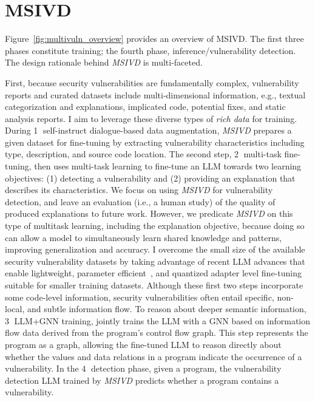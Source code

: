 \documentclass[12pt,openany,oneside,table]{cmuthesis}
\begin{document}
\section{MSIVD}

Figure~\ref{fig:multivuln_overview} provides an overview of MSIVD. The first three phases constitute training; the fourth phase, inference/vulnerability detection.
The design rationale behind \textit{MSIVD} is multi-faceted.  

First, because security vulnerabilities are fundamentally complex, 
vulnerability reports and curated datasets include multi-dimensional information, e.g., textual categorization and explanations, implicated code, potential fixes, and static analysis reports.  
I aim to leverage these diverse types of \emph{rich data} for training. 
During \textcircled{1} self-instruct dialogue-based data augmentation, \textit{MSIVD} prepares a given dataset for fine-tuning by extracting vulnerability characteristics including type, description, and source code location. 
The second step, \textcircled{2} multi-task fine-tuning, then uses multi-task learning to fine-tune an LLM towards two learning objectives:
(1) detecting a vulnerability and (2) providing an explanation that describes its characteristics. We focus on using \textit{MSIVD} for vulnerability detection, and leave an evaluation (i.e., a human study) of the quality of produced explanations to future work. However, we predicate \textit{MSIVD} on this type of multitask learning, including the explanation objective, because doing so can allow a model to simultaneously learn shared knowledge and patterns, improving generalization and accuracy. 
I overcome the small size of the available security vulnerability datasets
by taking advantage of recent LLM advances that enable lightweight, parameter efficient~\cite{peft}, and quantized adapter level fine-tuning~\cite{Llmao} suitable for smaller training datasets. 
Although these first two steps incorporate some code-level information, security vulnerabilities often entail specific, non-local, and subtle information flow.  
To reason about deeper semantic information, 
\textcircled{3} LLM+GNN training, jointly trains the LLM with a GNN based on information flow data derived from the program's control flow graph. 
This step represents the program as a graph, allowing the fine-tuned LLM to reason directly about 
whether the values and
data relations in a program indicate the occurrence of a vulnerability. 
In the \textcircled{4} detection phase, given a program, the vulnerability detection LLM trained by \textit{MSIVD} predicts whether a program contains a vulnerability.
\end{document}
